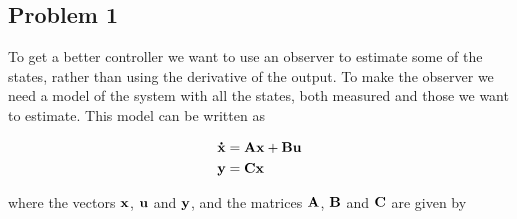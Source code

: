 \subsection{Problem 1}
To get a better controller we want to use an observer to estimate some of the states, rather than using the derivative of the output. To make the observer we need a model of the system with all the states, both measured and those we want to estimate. This model can be written as

\begin{subequations}
	\begin{align*}
		\mathbf{\dot x} &= \mathbf{A}\mathbf{x} + \mathbf{B}\mathbf{u}\\
		\mathbf{y} &= \mathbf{C}\mathbf{x}
	\end{align*}
\end{subequations}

where the vectors $\mathbf{x}$, $\mathbf{u}$ and $\mathbf{y}$, and the matrices $\mathbf{A}$, $\mathbf{B}$ and $\mathbf{C}$ are given by

